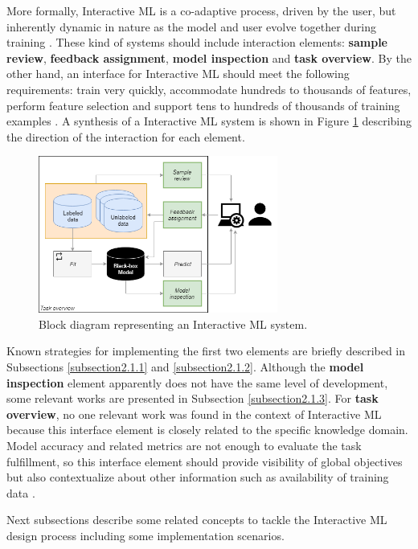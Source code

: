More formally, Interactive ML is a co-adaptive process, driven by the user, but inherently dynamic in nature as the model and user evolve together during training \cite{Dudley2018}. These kind of systems should include interaction elements: \textbf{sample review}, \textbf{feedback assignment}, \textbf{model inspection} and \textbf{task overview}. By the other hand, an interface for Interactive ML should meet the following requirements: train very quickly, accommodate hundreds to thousands of features, perform feature selection and support tens to hundreds of thousands of training examples \cite{Fails2003}. A synthesis of a Interactive ML system is shown in Figure \ref{fig:InteractiveML} describing the direction of the interaction for each element. 

\begin{figure}[ht]
 \centering
 \includegraphics[width=0.7\textwidth]{InteractiveML.png}
 \caption{Block diagram representing an Interactive ML system.}
 \label{fig:InteractiveML}
\end{figure}

Known strategies for implementing the first two elements are briefly described in Subsections \ref{subsection2.1.1} and \ref{subsection2.1.2}. Although the \textbf{model inspection} element apparently does not have the same level of development, some relevant works are presented in Subsection \ref{subsection2.1.3}. For \textbf{task overview}, no one relevant work was found in the context of Interactive ML because this interface element is closely related to the specific knowledge domain. Model accuracy and related metrics are not enough to evaluate the task fulfillment, so this interface element should provide visibility of global objectives but also contextualize about other information such as availability of training data \cite{Dudley2018}.

Next subsections describe some related concepts to tackle the Interactive ML design process including some implementation scenarios.

